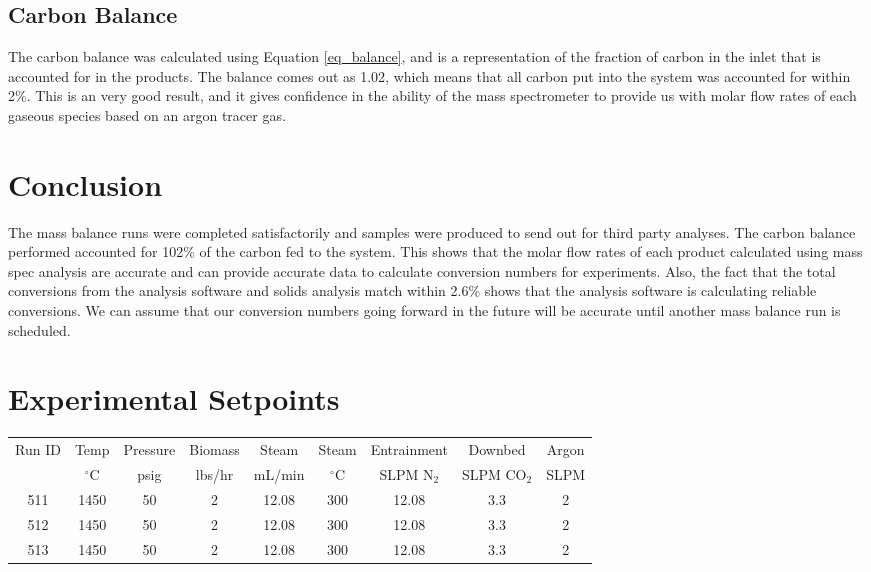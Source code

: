 \documentclass[11pt,twocolumn]{article}
\begin{document}
\subsection*{Carbon Balance}

The carbon balance was calculated using Equation \ref{eq_balance}, and is a representation of the fraction of carbon in the inlet that is accounted for in the products.  The balance comes out as 1.02, which means that all carbon put into the system was accounted for within 2\%.  This is an very good result, and it gives confidence in the ability of the mass spectrometer to provide us with molar flow rates of each gaseous species based on an argon tracer gas.




\section*{Conclusion}

The mass balance runs were completed satisfactorily and samples were produced to send out for third party analyses.  The carbon balance performed accounted for 102\% of the carbon fed to the system.  This shows that the molar flow rates of each product calculated using mass spec analysis are accurate and can provide accurate data to calculate conversion numbers for experiments.  Also, the fact that the total conversions from the analysis software and solids analysis match within 2.6\% shows that the analysis software is calculating reliable conversions.  We can assume that our conversion numbers going forward in the future will be accurate until another mass balance run is scheduled.




\newpage
\appendix
\onecolumn



\section{Experimental Setpoints}
\label{ap_setpoints}

\begin{tabular}{c c c c c c c c c}
	\toprule
	\multirow{2}{*}{Run ID} &  Temp &  Pressure &  Biomass &  Steam &  Steam &  Entrainment & Downbed & Argon \\
	{}					& $^\circ$C & psig	& lbs/hr	& mL/min	& $^\circ$C	& SLPM N$_2$	&	SLPM CO$_2$	& SLPM	\\
	\midrule
	511    &       1450 &        50 &             2 &     12.08 &       300 &       12.08 &                3.3 &            2 \\
	512    &       1450 &        50 &             2 &     12.08 &       300 &       12.08 &                3.3 &            2 \\
	513    &       1450 &        50 &             2 &     12.08 &       300 &       12.08 &                3.3 &            2 \\
	\bottomrule
\end{tabular}
\end{document}
